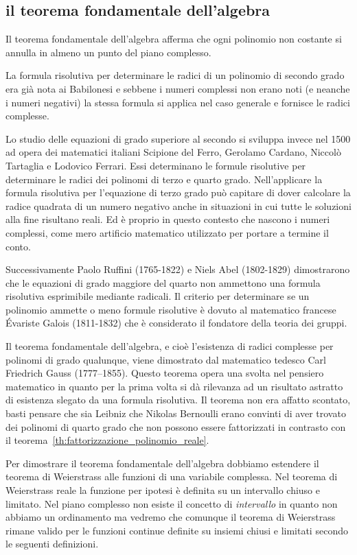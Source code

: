 \subsection{il teorema fondamentale dell'algebra}

Il teorema fondamentale dell'algebra afferma che ogni polinomio non costante 
si annulla in almeno un punto del piano complesso.

La formula risolutiva per determinare le radici di un polinomio di secondo grado 
era già nota ai Babilonesi e sebbene i numeri complessi non erano noti 
(e neanche i numeri negativi) la stessa formula si applica 
nel caso generale e fornisce le radici complesse.

Lo studio delle equazioni di grado superiore al secondo si sviluppa invece 
nel 1500 ad opera dei matematici italiani Scipione del Ferro, 
Gerolamo Cardano, Niccolò Tartaglia e Lodovico Ferrari.
Essi determinano le formule risolutive per determinare le radici 
dei polinomi di terzo e quarto grado. 
Nell'applicare la formula risolutiva per l'equazione di terzo grado 
può capitare di dover calcolare la radice quadrata di un numero negativo
anche in situazioni in cui tutte le soluzioni alla fine risultano reali.
Ed è proprio in questo contesto che nascono i numeri complessi, come 
mero artificio matematico utilizzato per portare a termine il conto.

Successivamente Paolo Ruffini (1765-1822) e Niels Abel (1802-1829) dimostrarono che le equazioni 
di grado maggiore del quarto non ammettono una formula risolutiva 
esprimibile mediante radicali. 
Il criterio per determinare se un polinomio
ammette o meno formule risolutive è dovuto al matematico francese Évariste Galois
(1811-1832) che è considerato il fondatore della teoria dei gruppi.

Il teorema fondamentale dell'algebra, e cioè l'esistenza di radici 
complesse per polinomi di grado qualunque, viene dimostrato dal 
matematico tedesco Carl Friedrich Gauss (1777--1855). 
Questo teorema opera una svolta nel pensiero matematico in quanto 
per la prima volta si dà rilevanza ad un risultato astratto di esistenza 
slegato da una formula risolutiva. 
Il teorema non era affatto scontato, basti pensare che sia Leibniz 
che Nikolas Bernoulli erano convinti di aver trovato dei polinomi 
di quarto grado che non possono essere fattorizzati in contrasto 
con il teorema~\ref{th:fattorizzazione_polinomio_reale}.

Per dimostrare il teorema fondamentale dell'algebra dobbiamo estendere il teorema 
di Weierstrass alle funzioni di una variabile complessa.
Nel teorema di Weierstrass reale la funzione per ipotesi è definita su un intervallo
chiuso e limitato. 
Nel piano complesso non esiste il concetto di \emph{intervallo} in quanto non abbiamo 
un ordinamento ma vedremo che comunque il teorema di Weierstrass rimane valido per 
le funzioni continue definite su insiemi chiusi e limitati secondo le seguenti definizioni.

